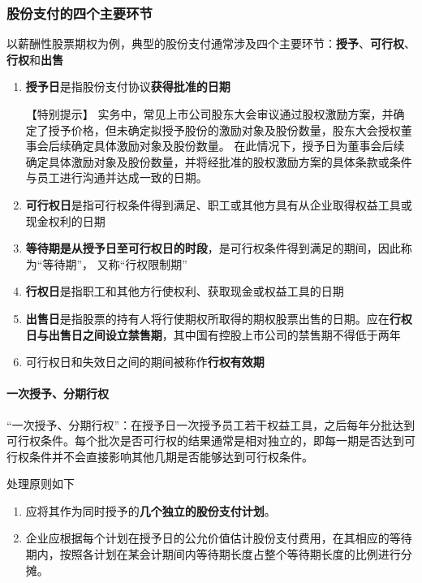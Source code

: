 \documentclass[UTF8,12pt]{ctexart}
\numberwithin{equation}{section} %
\numberwithin{figure}{section}
\numberwithin{table}{section}
\begin{document}
	\subsubsection{股份支付的四个主要环节}
	以薪酬性股票期权为例，典型的股份支付通常涉及四个主要环节：\textbf{授予}、\textbf{可行权}、\textbf{行权}和\textbf{出售}
	
	\begin{enumerate}
		\item \textbf{授予日}是指股份支付协议\textbf{获得批准的日期}
		
		【特别提示】
		实务中，常见上市公司股东大会审议通过股权激励方案，并确定了授予价格，但未确定拟授予股份的激励对象及股份数量，股东大会授权董事会后续确定具体激励对象及股份数量。
		在此情况下，授予日为董事会后续确定具体激励对象及股份数量，并将经批准的股权激励方案的具体条款或条件与员工进行沟通并达成一致的日期。
		
		\item \textbf{可行权日}是指可行权条件得到满足、职工或其他方具有从企业取得权益工具或现金权利的日期
		
		\item \textbf{等待期是从授予日至可行权日的时段}，是可行权条件得到满足的期间，因此称为“等待期”， 又称“行权限制期”
		
		\item \textbf{行权日}是指职工和其他方行使权利、获取现金或权益工具的日期
		
		\item \textbf{出售日}是指股票的持有人将行使期权所取得的期权股票出售的日期。应在\textbf{行权日与出售日之间设立禁售期}，其中国有控股上市公司的禁售期不得低于两年
		
		\item 可行权日和失效日之间的期间被称作\textbf{行权有效期}
	\end{enumerate}

	\paragraph{一次授予、分期行权}“一次授予、分期行权”：在授予日一次授予员工若干权益工具，之后每年分批达到可行权条件。每个批次是否可行权的结果通常是相对独立的，即每一期是否达到可行权条件并不会直接影响其他几期是否能够达到可行权条件。
	
	处理原则如下
	\begin{enumerate}
		\item 应将其作为同时授予的\textbf{几个独立的股份支付计划}。
		
		\item 企业应根据每个计划在授予日的公允价值估计股份支付费用，在其相应的等待期内，按照各计划在某会计期间内等待期长度占整个等待期长度的比例进行分摊。
	\end{enumerate}
\end{document}
